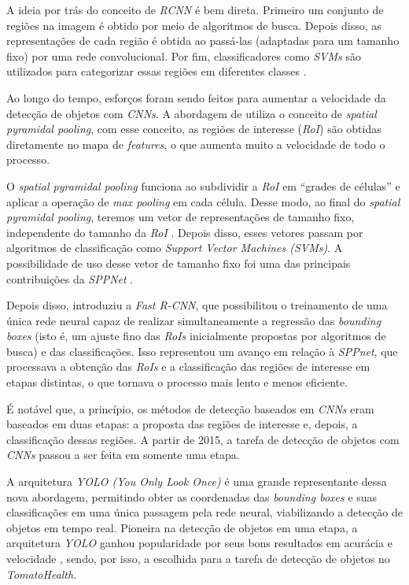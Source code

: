 A ideia por trás do conceito de \emph{RCNN} é bem direta. Primeiro um conjunto de regiões na imagem é obtido por meio de algoritmos de busca. Depois disso, as representações de cada região é obtida ao passá-las (adaptadas para um tamanho fixo) por uma rede convolucional. Por fim, classificadores como \emph{SVMs} são utilizados para categorizar essas regiões em diferentes classes \citep{Zou2019Object}.

Ao longo do tempo, esforços foram sendo feitos para aumentar a velocidade da detecção de objetos com \emph{CNNs}. A abordagem de \cite{SPPNet} utiliza o conceito de \emph{spatial pyramidal pooling}, com esse conceito, as regiões de interesse (\emph{RoI}) são obtidas diretamente no mapa de \emph{features}, o que aumenta muito a velocidade de todo o processo.

O \emph{spatial pyramidal pooling} funciona ao subdividir a \emph{RoI} em ``grades de células'' e aplicar a operação de \emph{max pooling} em cada célula. Desse modo, ao final do \emph{spatial pyramidal pooling}, teremos um vetor de representações de tamanho fixo, independente do tamanho da \emph{RoI} \citep{SPPNet}. Depois disso, esses vetores passam por algoritmos de classificação como \emph{Support Vector Machines (SVMs)}. A possibilidade de uso desse vetor de tamanho fixo foi uma das principais contribuições da \emph{SPPNet} \citep{Zou2019Object}.

Depois disso, \cite{fastRCNN} introduziu a \emph{Fast R-CNN}, que possibilitou o treinamento de uma única rede neural capaz de realizar simultaneamente a regressão das \emph{bounding boxes} (isto é, um ajuste fino das \emph{RoIs} inicialmente propostas por algoritmos de busca) e das classificações. Isso representou um avanço em relação à \emph{SPPnet}, que processava a obtenção das \emph{RoIs} e a classificação das regiões de interesse em etapas distintas, o que tornava o processo mais lento e menos eficiente.

É notável que, a princípio, os métodos de detecção baseados em \emph{CNNs} eram baseados em duas etapas: a proposta das regiões de interesse e, depois, a classificação dessas regiões. A partir de 2015, a tarefa de detecção de objetos com \emph{CNNs} passou a ser feita em somente uma etapa. 

A arquitetura \emph{YOLO (You Only Look Once)} é uma grande representante dessa nova abordagem, permitindo obter as coordenadas das \emph{bounding boxes} e suas classificações em uma única passagem pela rede neural, viabilizando a detecção de objetos em tempo real. Pioneira na detecção de objetos em uma etapa, a arquitetura \emph{YOLO} ganhou popularidade por seus bons resultados em acurácia e velocidade \citep{Zou2019Object}, sendo, por isso, a escolhida para a tarefa de detecção de objetos no \emph{TomatoHealth}.

